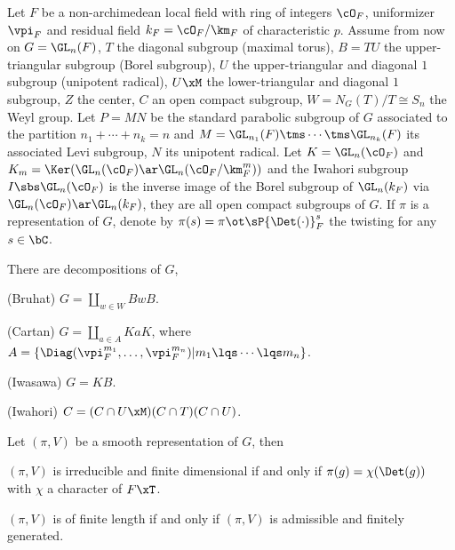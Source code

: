 \documentclass[a4paper, twoside]{article}
\begin{document}
\begin{stp}
	Let $F$ be a non-archimedean local field with ring of integers $\cO_{F}$, uniformizer $\vpi_{F}$ and residual field $k_{F}=\cO_{F}/\km_{F}$ of characteristic $p$. Assume from now on $G=\GL_{n}(F)$, $T$ the diagonal subgroup (maximal torus), $B=TU$ the upper-triangular subgroup (Borel subgroup), $U$ the upper-triangular and diagonal $1$ subgroup (unipotent radical), $U\xM$ the lower-triangular and diagonal $1$ subgroup, $Z$ the center, $C$ an open compact subgroup, $W=N_{G}(T)/T\cong S_{n}$ the Weyl group. Let $P=MN$ be the standard parabolic subgroup of $G$ associated to the partition $n_{1}+\cdots+n_{k}=n$ and $M=\GL_{n_{1}}(F)\tms\cdots\tms\GL_{n_{k}}(F)$ its associated Levi subgroup, $N$ its unipotent radical. Let $K=\GL_{n}(\cO_{F})$ and $K_{m}=\Ker(\GL_{n}(\cO_{F})\ar\GL_{n}(\cO_{F}/\km_{F}^{m}))$ and the Iwahori subgroup $I\sbs\GL_{n}(\cO_{F})$ is the inverse image of the Borel subgroup of $\GL_{n}(k_{F})$ via $\GL_{n}(\cO_{F})\ar\GL_{n}(k_{F})$, they are all open compact subgroups of $G$. If $\pi$ is a representation of $G$, denote by $\pi(s)=\pi\ot\sP{\Det(\cdot)}_{F}^{s}$ the twisting for any $s\in\bC$.
\end{stp}

\begin{thm}[{\cite[3.2, 3.3, 3.4, 3.5]{PR2008}}]
	There are decompositions of $G$,
	\begin{enr}
		\item (Bruhat) $G=\coprod_{w\in W}BwB$.
		\item (Cartan) $G=\coprod_{a\in A}KaK$, where $A=\{\Diag(\vpi_{F}^{m_{1}},\ldots,\vpi_{F}^{m_{n}})|m_{1}\lqs\cdots\lqs m_{n}\}$.
		\item (Iwasawa) $G=KB$.
		\item (Iwahori) $C=(C\cap U\xM)(C\cap T)(C\cap U)$.
	\end{enr}
\end{thm}


\begin{thm}[{\cite[3.6, 3.7]{PR2008}}]
	Let $(\pi,V)$ be a smooth representation of $G$, then
	\begin{enr}
		\item $(\pi,V)$ is irreducible and finite dimensional if and only if $\pi(g)=\chi(\Det(g))$ with $\chi$ a character of $F\xT$.
		\item $(\pi,V)$ is of finite length if and only if $(\pi,V)$ is admissible and finitely generated.
	\end{enr}
\end{thm}
\end{document}

